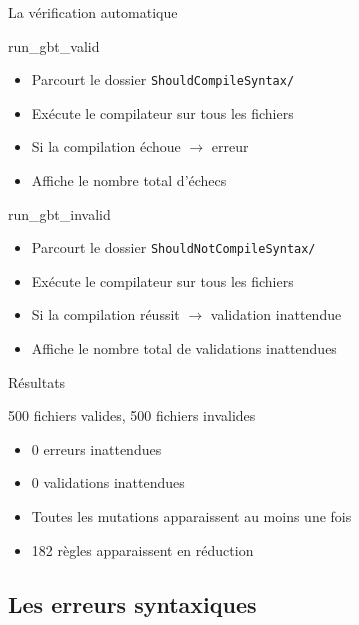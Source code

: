\begin{frame}{La vérification automatique}
    \begin{block}{run\_gbt\_valid}
        \begin{itemize}
            \item Parcourt le dossier \texttt{ShouldCompileSyntax/}
            \item Exécute le compilateur sur tous les fichiers
            \item Si la compilation échoue $\rightarrow$ erreur
            \item Affiche le nombre total d'échecs
        \end{itemize}
    \end{block}

    \begin{block}{run\_gbt\_invalid}
        \begin{itemize}
            \item Parcourt le dossier \texttt{ShouldNotCompileSyntax/}
            \item Exécute le compilateur sur tous les fichiers
            \item Si la compilation réussit $\rightarrow$ validation inattendue
            \item Affiche le nombre total de validations inattendues
        \end{itemize}
    \end{block}
\end{frame}

\begin{frame}{Résultats}
    \begin{block}{500 fichiers valides, 500 fichiers invalides}
        \begin{itemize}
            \item 0 erreurs inattendues
            \item 0 validations inattendues
            \item Toutes les mutations apparaissent au moins une fois
            \item 182 règles apparaissent en réduction
        \end{itemize}
    \end{block}
\end{frame}

\subsection{Les erreurs syntaxiques}

